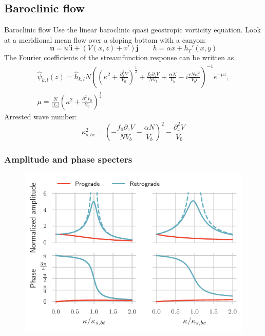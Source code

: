\documentclass{beamer}
\newcommand{\pd}[1]{\partial_{#1}}
\newcommand{\pdd}[1]{\partial_{#1}^2}
\begin{document}
\subsection{Baroclinic flow}
\begin{frame}{Baroclinic flow}
Use the linear baroclinic quasi geostropic vorticity equation. 
Look at a meridional mean flow over a sloping bottom with a canyon: 
\begin{equation*}
    \mathbf{u} = u'\mathbf{i} + \left(V(x,z)+v'\right)\mathbf{j} \qquad h = \alpha x + h_T'(x,y)
\end{equation*}
The Fourier coefficients of the streamfunction response can be written as
\begin{multline*}\label{eq:baroclinic:sol}
    \hat{\psi}_{k,l}(z) = \hat{h}_{k,l}N\left(\left(\kappa^2 + \frac{\pdd{x}V}{V_0} \right)^{\frac{1}{2}} + \frac{f_0\pd{z}V}{NV_b} + \frac{\alpha N}{V_b} - i\frac{rN\kappa^2}{V_bl}\right)^{-1}e^{-\mu z},\\ \mu = \frac{N}{|f_0|}\left( \kappa^2+\frac{\pdd{x}V_0}{V_0}\right)^{\frac{1}{2}} 
\end{multline*}
Arrested wave number:
\begin{equation*}
    \kappa_{s,bc}^2 = \left(-\frac{f_0\pd{z}V}{NV_b} - \frac{\alpha N}{V_b}\right)^2 - \frac{\pdd{x}V}{V_0}
\end{equation*}
\end{frame}

\begin{frame}
\frametitle{Amplitude and phase specters}
\begin{figure}
\centering
\includegraphics{figures/amplitude_phase.pdf}
\end{figure}
\end{frame}
\end{document}
